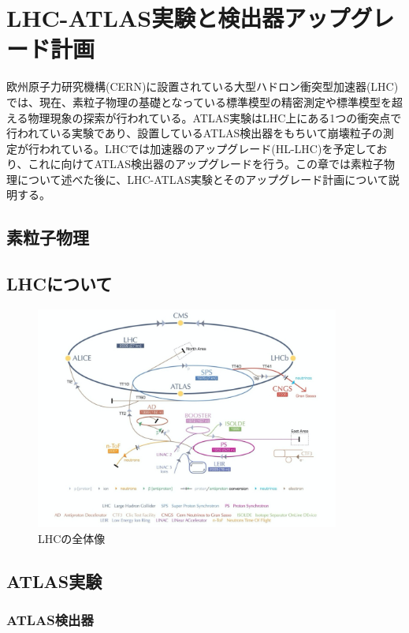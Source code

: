 \chapter{LHC-ATLAS実験と検出器アップグレード計画}
欧州原子力研究機構(CERN)に設置されている大型ハドロン衝突型加速器(LHC)では、現在、素粒子物理の基礎となっている標準模型の精密測定や標準模型を超える物理現象の探索が行われている。ATLAS実験はLHC上にある1つの衝突点で行われている実験であり、設置しているATLAS検出器をもちいて崩壊粒子の測定が行われている。LHCでは加速器のアップグレード(HL-LHC)を予定しており、これに向けてATLAS検出器のアップグレードを行う。この章では素粒子物理について述べた後に、LHC-ATLAS実験とそのアップグレード計画について説明する。

\section{素粒子物理}

\section{LHCについて}

\begin{figure}[bpt]\centering
\includegraphics[width=10cm]{LHC_overview}
\caption[LHCの全体像]{LHCの全体像\cite{1-1}}
\label{LHC_overview}
\end{figure}

\section{ATLAS実験}

\subsection{ATLAS検出器}

